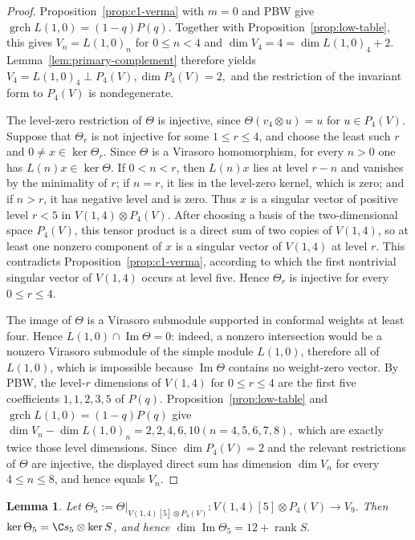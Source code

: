 \documentclass[12pt,leqno]{amsart}
\numberwithin{equation}{section} \newtheorem{thm}{Theorem}[section] \newtheorem{lem}[thm]{Lemma} \newtheorem{ex}[thm]{Example} \newtheorem{prop}[thm]{Proposition} \newtheorem{cor}[thm]{Corollary} \newtheorem{defi}[thm]{Definition} \newtheorem{rmk}[thm]{Remark} \newtheorem{notation}[thm]{Notation}
\newcommand{\grch}{\operatorname{grch}}
\begin{document}
\begin{proof}
Proposition~\ref{prop:c1-verma} with $m=0$ and PBW give \(\grch L(1,0)=(1-q)P(q).\) Together with Proposition~\ref{prop:low-table}, this gives $V_n=L(1,0)_n$ for $0\le n<4$ and \(\dim V_4=4=\dim L(1,0)_4+2.\) Lemma~\ref{lem:primary-complement} therefore yields \(V_4=L(1,0)_4\mathbin{\perp}P_4(V), \dim P_4(V)=2,\) and the restriction of the invariant form to $P_4(V)$ is nondegenerate.

The level-zero restriction of $\Theta$ is injective, since \(\Theta(v_4\otimes u)=u\) for $u\in P_4(V)$. Suppose that $\Theta_r$ is not injective for some $1\le r\le4$, and choose the least such $r$ and $0\ne x\in\ker\Theta_r$. Since $\Theta$ is a Virasoro homomorphism, for every $n>0$ one has $L(n)x\in\ker\Theta$. If $0<n<r$, then $L(n)x$ lies at level $r-n$ and vanishes by the minimality of $r$; if $n=r$, it lies in the level-zero kernel, which is zero; and if $n>r$, it has negative level and is zero. Thus $x$ is a singular vector of positive level $r<5$ in $V(1,4)\otimes P_4(V)$. After choosing a basis of the two-dimensional space $P_4(V)$, this tensor product is a direct sum of two copies of $V(1,4)$, so at least one nonzero component of $x$ is a singular vector of $V(1,4)$ at level $r$. This contradicts Proposition~\ref{prop:c1-verma}, according to which the first nontrivial singular vector of $V(1,4)$ occurs at level five. Hence $\Theta_r$ is injective for every $0\le r\le4$.

The image of $\Theta$ is a Virasoro submodule supported in conformal weights at least four. Hence \(L(1,0)\cap\operatorname{Im}\Theta=0\): indeed, a nonzero intersection would be a nonzero Virasoro submodule of the simple module $L(1,0)$, therefore all of $L(1,0)$, which is impossible because $\operatorname{Im}\Theta$ contains no weight-zero vector. By PBW, the level-$r$ dimensions of $V(1,4)$ for $0\le r\le4$ are the first five coefficients $1,1,2,3,5$ of $P(q)$. Proposition~\ref{prop:low-table} and \(\grch L(1,0)=(1-q)P(q)\) give \(\dim V_n-\dim L(1,0)_n=2,2,4,6,10 (n=4,5,6,7,8),\) which are exactly twice those level dimensions. Since $\dim P_4(V)=2$ and the relevant restrictions of $\Theta$ are injective, the displayed direct sum has dimension $\dim V_n$ for every $4\le n\le8$, and hence equals $V_n$.
\end{proof}

\begin{lem}\label{lem:k4-kernel}
Let \(\Theta_5:=\Theta|_{V(1,4)[5]\otimes P_4(V)}: V(1,4)[5]\otimes P_4(V)\longrightarrow V_9\). Then \(\ker\Theta_5=\C s_5\otimes\ker S\), and hence \(\dim\operatorname{Im}\Theta_5=12+\operatorname{rank}S.\)
\end{lem}
\end{document}
